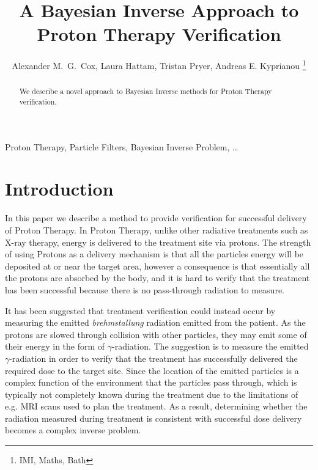\documentclass[lettersize,journal]{IEEEtran}
\begin{document}
\title{A Bayesian Inverse Approach to Proton Therapy Verification}

\author{Alexander M.~G.~Cox, Laura Hattam, Tristan Pryer, Andreas E. Kyprianou 
\thanks{IMI, Maths, Bath}%
}



\maketitle

\begin{abstract}
We describe a novel approach to Bayesian Inverse methods for Proton
Therapy verification.
\end{abstract}

\begin{IEEEkeywords}
Proton Therapy, Particle Filters, Bayesian Inverse Problem, \dots
\end{IEEEkeywords}

\section{Introduction}
In this paper we describe a method to provide verification for successful delivery of Proton Therapy. In Proton Therapy, unlike other radiative treatments such as X-ray therapy, energy is delivered to the treatment site via protons. The strength of using Protons as a delivery mechanism is that all the particles energy will be deposited at or near the target area, however a consequence is that essentially all the protons are absorbed by the body, and it is hard to verify that the treatment has been successful because there is no pass-through radiation to measure.

It has been suggested that treatment verification could instead occur by measuring the emitted \emph{brehmstallung} radiation emitted from the patient. As the protons are slowed through collision with other particles, they may emit some of their energy in the form of $\gamma$-radiation. The suggestion is to measure the emitted $\gamma$-radiation in order to verify that the treatment has successfully delivered the required dose to the target site. Since the location of the emitted particles is a complex function of the environment that the particles pass through, which is typically not completely known during the treatment due to the limitations of e.g. MRI scans used to plan the treatment. As a result, determining whether the radiation measured during treatment is consistent with successful dose delivery becomes a complex inverse problem.
\end{document}
